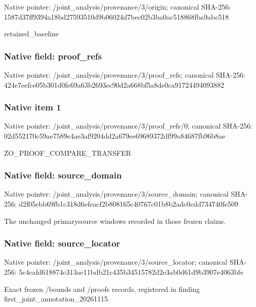 \documentclass[10pt,a4paper]{article}
\begin{document}
Native pointer: /joint\_analysis/provenance/3/origin; canonical SHA-256: 1587d37ff9394a18bd275935\allowbreak{}10d9b06024d7bec02b3ba0ac\allowbreak{}518868fba9abc518


retained\_baseline


\subsubsection{Native field: proof\_refs}


Native pointer: /joint\_analysis/provenance/3/proof\_refs; canonical SHA-256: 424e7eefce05b301d0fe69a6\allowbreak{}3b2693ec90d2a668bf5a8de0\allowbreak{}ca91724494093882



\subsubsection{Native item 1}


Native pointer: /joint\_analysis/provenan\allowbreak{}ce/3/proof\_refs/0; canonical SHA-256: 02d552170c59ae7589e4ae3a\allowbreak{}f9204dd2a679ee69689372df\allowbreak{}99a84687fb96b8ae


ZO\_PROOF\_COMPARE\_TRANSFER


\subsubsection{Native field: source\_domain}


Native pointer: /joint\_analysis/provenan\allowbreak{}ce/3/source\_domain; canonical SHA-256: d2f05ebb69fb1c318d6efeac\allowbreak{}f2b808165c40767c01b8b2ad\allowbreak{}c0cdd734740fe509


The unchanged primarysource windows recorded in those frozen claims.


\subsubsection{Native field: source\_locator}


Native pointer: /joint\_analysis/provenan\allowbreak{}ce/3/source\_locator; canonical SHA-256: 5c4cafd618874c313ae11bdb\allowbreak{}21c435b34515782d2e3ab0d6\allowbreak{}1d9b3907e4063bfe


Exact frozen /bounds and /proofs records, registered in finding first\_joint\_annotation\_20261115.
\end{document}
